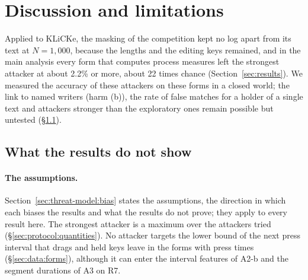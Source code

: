 \section{Discussion and limitations}
\label{sec:discussion}


Applied to KLiCKe, the masking of the competition kept no log apart from its text at $N = 1{,}000$, because the
lengths and the editing keys remained, and in the main analysis every form that computes process measures left
the strongest attacker at about 2.2\% or more, about 22 times chance (Section~\ref{sec:results}). We measured the accuracy of these attackers on these forms in a closed world;
the link to named writers (harm (b)), the rate of false matches for a holder of a single text and attackers stronger
than the exploratory ones remain possible but untested (\S\ref{sec:discussion:limits}).

\subsection{What the results do not show}
\label{sec:discussion:limits}

\paragraph{The assumptions.}
Section~\ref{sec:threat-model:bias} states the assumptions, the direction in which each biases the results and what
the results do not prove; they apply to every result here. The strongest attacker is a maximum over the attackers
tried (\S\ref{sec:protocol:quantities}). No attacker targets the lower bound of the next press
interval that drags and held keys leave in the forms with press times (\S\ref{sec:data:forms}), although it can enter
the interval features of A2-b and the segment durations of A3 on R7.

